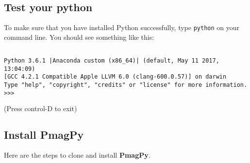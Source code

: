 \documentclass[11pt]{article}
\begin{document}
\subsection{Test your python}


To make sure that you have installed Python successfully, type \texttt{python} on your command line.  You should see something like this: \begin{verbatim}

Python 3.6.1 |Anaconda custom (x86_64)| (default, May 11 2017, 13:04:09)
[GCC 4.2.1 Compatible Apple LLVM 6.0 (clang-600.0.57)] on darwin
Type "help", "copyright", "credits" or "license" for more information.
>>>\end{verbatim}
(Press control-D to exit)


\subsection{Install PmagPy}

Here are the steps to clone and install {\bf PmagPy}.
\end{document}
